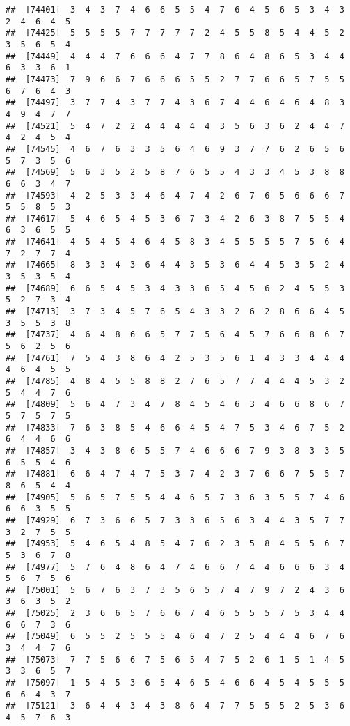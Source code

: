 \documentclass[
]{book}
\begin{document}
\begin{verbatim}
##  [74401]  3  4  3  7  4  6  6  5  5  4  7  6  4  5  6  5  3  4  3  2  4  6  4  5
##  [74425]  5  5  5  5  7  7  7  7  7  2  4  5  5  8  5  4  4  5  2  3  5  6  5  4
##  [74449]  4  4  4  7  6  6  6  4  7  7  8  6  4  8  6  5  3  4  4  6  3  3  6  1
##  [74473]  7  9  6  6  7  6  6  6  5  5  2  7  7  6  6  5  7  5  5  6  7  6  4  3
##  [74497]  3  7  7  4  3  7  7  4  3  6  7  4  4  6  4  6  4  8  3  4  9  4  7  7
##  [74521]  5  4  7  2  2  4  4  4  4  4  3  5  6  3  6  2  4  4  7  4  2  4  5  4
##  [74545]  4  6  7  6  3  3  5  6  4  6  9  3  7  7  6  2  6  5  6  5  7  3  5  6
##  [74569]  5  6  3  5  2  5  8  7  6  5  5  4  3  3  4  5  3  8  8  6  6  3  4  7
##  [74593]  4  2  5  3  3  4  6  4  7  4  2  6  7  6  5  6  6  6  7  5  5  8  5  3
##  [74617]  5  4  6  5  4  5  3  6  7  3  4  2  6  3  8  7  5  5  4  6  3  6  5  5
##  [74641]  4  5  4  5  4  6  4  5  8  3  4  5  5  5  5  7  5  6  4  7  2  7  7  4
##  [74665]  8  3  3  4  3  6  4  4  3  5  3  6  4  4  5  3  5  2  4  3  5  3  5  4
##  [74689]  6  6  5  4  5  3  4  3  3  6  5  4  5  6  2  4  5  5  3  5  2  7  3  4
##  [74713]  3  7  3  4  5  7  6  5  4  3  3  2  6  2  8  6  6  4  5  3  5  5  3  8
##  [74737]  4  6  4  8  6  6  5  7  7  5  6  4  5  7  6  6  8  6  7  5  6  2  5  6
##  [74761]  7  5  4  3  8  6  4  2  5  3  5  6  1  4  3  3  4  4  4  4  6  4  5  5
##  [74785]  4  8  4  5  5  8  8  2  7  6  5  7  7  4  4  4  5  3  2  5  4  4  7  6
##  [74809]  5  6  4  7  3  4  7  8  4  5  4  6  3  4  6  6  8  6  7  5  7  5  7  5
##  [74833]  7  6  3  8  5  4  6  6  4  5  4  7  5  3  4  6  7  5  2  6  4  4  6  6
##  [74857]  3  4  3  8  6  5  5  7  4  6  6  6  7  9  3  8  3  3  5  6  5  5  4  6
##  [74881]  6  6  4  7  4  7  5  3  7  4  2  3  7  6  6  7  5  5  7  8  6  5  4  4
##  [74905]  5  6  5  7  5  5  4  4  6  5  7  3  6  3  5  5  7  4  6  6  6  3  5  5
##  [74929]  6  7  3  6  6  5  7  3  3  6  5  6  3  4  4  3  5  7  7  3  2  7  5  5
##  [74953]  5  4  6  5  4  8  5  4  7  6  2  3  5  8  4  5  5  6  7  5  3  6  7  8
##  [74977]  5  7  6  4  8  6  4  7  4  6  6  7  4  4  6  6  6  3  4  5  6  7  5  6
##  [75001]  5  6  7  6  3  7  3  5  6  5  7  4  7  9  7  2  4  3  6  3  6  3  5  2
##  [75025]  2  3  6  6  5  7  6  6  7  4  6  5  5  5  7  5  3  4  4  6  6  7  3  6
##  [75049]  6  5  5  2  5  5  5  4  6  4  7  2  5  4  4  4  6  7  6  3  4  4  7  6
##  [75073]  7  7  5  6  6  7  5  6  5  4  7  5  2  6  1  5  1  4  5  3  3  6  5  7
##  [75097]  1  5  4  5  3  6  5  4  6  5  4  6  6  4  5  4  5  5  5  6  6  4  3  7
##  [75121]  3  6  4  4  3  4  3  8  6  4  7  7  5  5  5  2  5  3  6  4  5  7  6  3

\end{verbatim}
\end{document}
